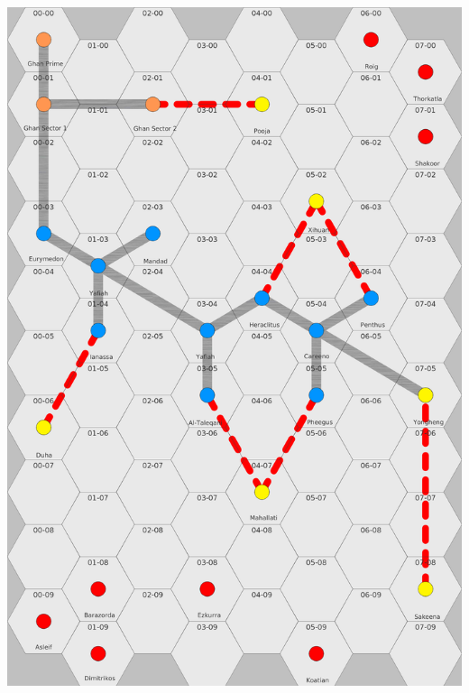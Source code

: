 \documentclass[10pt,twoside]{article}
\begin{document}
  \begin{center}
    \includegraphics[height=220mm]{sectormap}
  \end{center}
  
  \newpage
  
\end{document}
